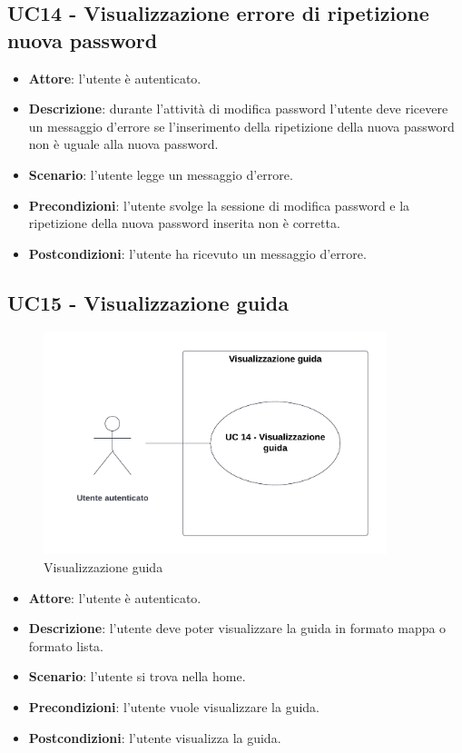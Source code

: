 \subsection{UC14 - Visualizzazione errore di ripetizione nuova password}
\begin{itemize}
    \item \textbf{Attore}: l'utente è autenticato.
    \item \textbf{Descrizione}: durante l'attività di modifica password l'utente deve ricevere un messaggio d'errore se l'inserimento della ripetizione della nuova password non è uguale alla nuova password.
    \item \textbf{Scenario}: l'utente legge un messaggio d'errore. 
    \item \textbf{Precondizioni}: l'utente svolge la sessione di modifica password e la ripetizione della nuova password inserita non è corretta.
    \item \textbf{Postcondizioni}: l'utente ha ricevuto un messaggio d'errore.
\end{itemize}

\subsection{UC15 - Visualizzazione guida}

\begin{figure}[H]
    \includegraphics[width=10cm]{sezioni/Images/UC14.png}
    \centering
    \caption{Visualizzazione guida}
\end{figure}

\begin{itemize}
    \item \textbf{Attore}: l'utente è autenticato.
    \item \textbf{Descrizione}: l'utente deve poter visualizzare la guida in formato mappa o formato lista.
    \item \textbf{Scenario}: l'utente si trova nella home.
    \item \textbf{Precondizioni}: l'utente vuole visualizzare la guida.
    \item \textbf{Postcondizioni}: l'utente visualizza la guida.
\end{itemize}

